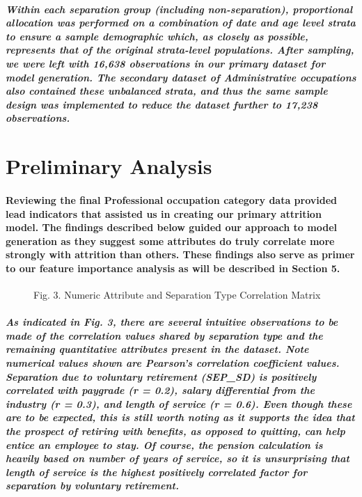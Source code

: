 \documentclass{article}
\begin{document}
\subparagraph{Within each separation group (including non-separation), proportional allocation was performed on a combination of date and age level strata to ensure a sample demographic which, as closely as possible, represents that of the original strata-level populations. After sampling, we were left with 16,638 observations in our primary dataset for model generation. The secondary dataset of Administrative occupations also contained these unbalanced strata, and thus the same sample design was implemented to reduce the dataset further to 17,238 observations.}
 
\section{Preliminary Analysis}

\paragraph{Reviewing the final Professional occupation category data provided lead indicators that assisted us in creating our primary attrition model. The findings described below guided our approach to model generation as they suggest some attributes do truly correlate more strongly with attrition than others. These findings also serve as primer to our feature importance analysis as will be described in Section 5.}
 
\begin{figure}
\caption{Fig. 3. Numeric Attribute and Separation Type Correlation Matrix}
\end{figure}
 
\subparagraph{As indicated in Fig. 3, there are several intuitive observations to be made of the correlation values shared by separation type and the remaining quantitative attributes present in the dataset. Note numerical values shown are Pearson’s correlation coefficient values. Separation due to voluntary retirement (SEP\_SD) is positively correlated with paygrade (r = 0.2), salary differential from the industry (r = 0.3), and length of service (r = 0.6). Even though these are to be expected, this is still worth noting as it supports the idea that the prospect of retiring with benefits, as opposed to quitting, can help entice an employee to stay. Of course, the pension calculation is heavily based on number of years of service, so it is unsurprising that length of service is the highest positively correlated factor for separation by voluntary retirement.}
 
\end{document}
